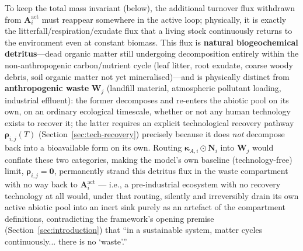 \documentclass[twocolumn,10pt]{article}
\begin{document}
To keep the total mass invariant (below), the additional turnover flux withdrawn from $\mathbf A^{\text{act}}_i$ must reappear somewhere in the active loop; physically, it is exactly the litterfall/respiration/exudate flux that a living stock continuously returns to the environment even at constant biomass. This flux is \textbf{natural biogeochemical detritus}---dead organic matter still undergoing decomposition entirely within the non-anthropogenic carbon/nutrient cycle (leaf litter, root exudate, coarse woody debris, soil organic matter not yet mineralised)---and is physically distinct from \textbf{anthropogenic waste} $\mathbf W_j$ (landfill material, atmospheric pollutant loading, industrial effluent): the former decomposes and re-enters the abiotic pool on its own, on an ordinary ecological timescale, whether or not any human technology exists to recover it; the latter requires an explicit technological recovery pathway $\boldsymbol\rho_{i,j}(T)$ (Section~\ref{sec:tech-recovery}) precisely because it does \emph{not} decompose back into a bioavailable form on its own. Routing $\boldsymbol\kappa_{A,i}\odot\mathbf N_i$ into $\mathbf W_j$ would conflate these two categories, making the model's own baseline (technology-free) limit, $\boldsymbol\rho_{i,j}=\mathbf 0$, permanently strand this detritus flux in the waste compartment with no way back to $\mathbf A^{\text{act}}_i$ --- i.e., a pre-industrial ecosystem with no recovery technology at all would, under that routing, silently and irreversibly drain its own active abiotic pool into an inert sink purely as an artefact of the compartment definitions, contradicting the framework's opening premise (Section~\ref{sec:introduction}) that ``in a sustainable system, matter cycles continuously... there is no `waste'.''
\end{document}

